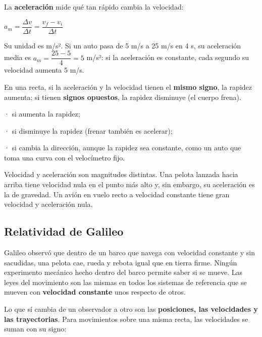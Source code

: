  

La \textbf{aceleración} mide qué tan rápido cambia la velocidad:

 
\begin{center}
$a_m = \dfrac{\Delta v}{\Delta t} = \dfrac{v_f - v_i}{\Delta t}$
\end{center}
 

Su unidad es m/s². Si un auto pasa de 5 m/s a 25 m/s en 4 s, su aceleración media es $a_m = \dfrac{25 - 5}{4} = 5$ m/s²: si la aceleración es constante, cada segundo su velocidad aumenta 5 m/s.

 

En una recta, si la aceleración y la velocidad tienen el \textbf{mismo signo}, la rapidez aumenta; si tienen \textbf{signos opuestos}, la rapidez disminuye (el cuerpo frena).

  
\begin{clave} · si aumenta la rapidez;\par · si disminuye la rapidez (frenar también es acelerar);\par · si cambia la dirección, aunque la rapidez sea constante, como un auto que toma una curva con el velocímetro fijo.\end{clave}
 
\begin{clave}[{Recuerda}] Velocidad y aceleración son magnitudes distintas. Una pelota lanzada hacia arriba tiene velocidad nula en el punto más alto y, sin embargo, su aceleración es la de gravedad. Un avión en vuelo recto a velocidad constante tiene gran velocidad y aceleración nula.\end{clave}
\subsection{Relatividad de Galileo}
Galileo observó que dentro de un barco que navega con velocidad constante y sin sacudidas, una pelota cae, rueda y rebota igual que en tierra firme. Ningún experimento mecánico hecho dentro del barco permite saber si se mueve. Las leyes del movimiento son las mismas en todos los sistemas de referencia que se mueven con \textbf{velocidad constante} unos respecto de otros.

 

Lo que sí cambia de un observador a otro son las \textbf{posiciones, las velocidades y las trayectorias}. Para movimientos sobre una misma recta, las velocidades se suman con su signo:

